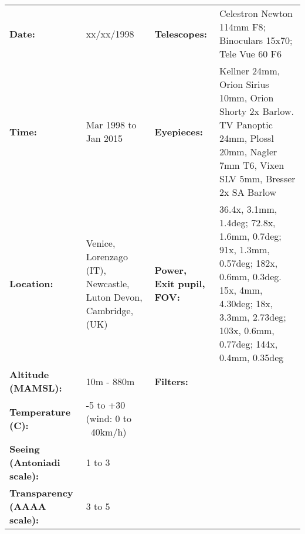 \begin{tabular}{ p{1.7in} p{1.2in} p{1.5in} p{4.2in}}
{\bf Date:} & xx/xx/1998 & {\bf Telescopes:} & Celestron Newton 114mm F8; Binoculars 15x70; Tele Vue 60 F6 \\ 
{\bf Time:} & Mar 1998 to Jan 2015 & {\bf Eyepieces:} & Kellner 24mm, Orion Sirius 10mm, Orion Shorty 2x Barlow. TV Panoptic 24mm, Plossl 20mm, Nagler 7mm T6, Vixen SLV 5mm, Bresser 2x SA Barlow \\ 
{\bf Location:} & Venice, Lorenzago (IT), Newcastle, Luton Devon, Cambridge, (UK) & {\bf Power, Exit pupil, FOV:} & 36.4x, 3.1mm, 1.4deg; 72.8x, 1.6mm, 0.7deg; 91x, 1.3mm, 0.57deg; 182x, 0.6mm, 0.3deg. 15x, 4mm, 4.30deg; 18x, 3.3mm, 2.73deg; 103x, 0.6mm, 0.77deg; 144x, 0.4mm, 0.35deg \\ 
{\bf Altitude (MAMSL):} & 10m - 880m & {\bf Filters:} &  \\ 
{\bf Temperature (C):} & -5 to +30 (wind: 0 to ~40km/h) & & \\ 
{\bf Seeing (Antoniadi scale):} & 1 to 3 & & \\ 
{\bf Transparency (AAAA scale):} & 3 to 5 & & \\ 
\end{tabular}
\centering 

